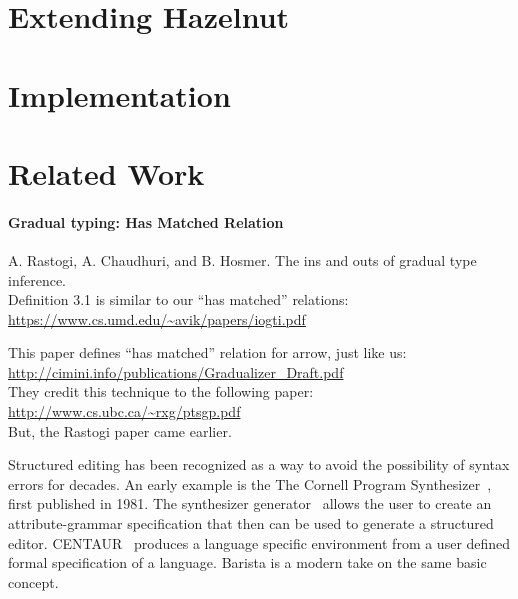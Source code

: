 \documentclass[preprint,9pt]{sigplanconf}
\begin{document}
% 


\section{Extending Hazelnut}\label{sec:extending}


\section{Implementation}
\label{sec:impl}


\section{Related Work}\label{sec:rw}

\paragraph{Gradual typing: Has Matched Relation}
%
A. Rastogi, A. Chaudhuri, and B. Hosmer. The ins and outs of gradual type inference.
\\
Definition 3.1 is similar to our ``has matched'' relations:
\\
\url{https://www.cs.umd.edu/~avik/papers/iogti.pdf}

This paper defines ``has matched'' relation for arrow, just like us:
\\
\url{http://cimini.info/publications/Gradualizer_Draft.pdf}
\\
They credit this technique to the following paper:
\\
\url{http://www.cs.ubc.ca/~rxg/ptsgp.pdf}
\\
But, the Rastogi paper came earlier.



Structured editing has been recognized as a way to avoid the possibility of syntax errors for decades.  An early example is the
The Cornell Program Synthesizer~\cite{teitelbaum_cornell_1981}, first published in 1981.
The synthesizer generator~\cite{Reps:1984:SG:390010.808247} allows the user to create an attribute-grammar specification that then can be used to generate a structured editor.
CENTAUR~\cite{Borras:1988:CS:64140.65005} produces a language specific environment from a user defined formal specification of a language. Barista \cite{ko_barista:_2006} is a modern take on the same basic concept.%
\end{document}
